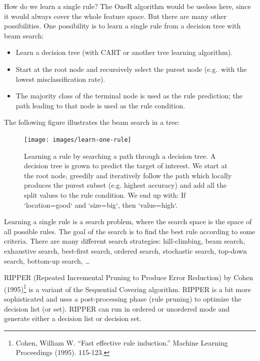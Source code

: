 \documentclass[
  12pt,
]{krantz}
\providecommand{\tightlist}{%
  \setlength{\itemsep}{0pt}\setlength{\parskip}{0pt}}
\begin{document}
How do we learn a single rule?
The OneR algorithm would be useless here, since it would always cover the whole feature space.
But there are many other possibilities.
One possibility is to learn a single rule from a decision tree with beam search:

\begin{itemize}
\tightlist
\item
  Learn a decision tree (with CART or another tree learning algorithm).
\item
  Start at the root node and recursively select the purest node (e.g.~with the lowest misclassification rate).
\item
  The majority class of the terminal node is used as the rule prediction;
  the path leading to that node is used as the rule condition.
\end{itemize}

The following figure illustrates the beam search in a tree:

\begin{figure}

{\centering \texttt{[image: images/learn-one-rule]} 

}

\caption{Learning a rule by searching a path through a decision tree. A decision tree is grown to predict the target of interest. We start at the root node, greedily and iteratively follow the path which locally produces the purest subset (e.g. highest accuracy) and add all the split values to the rule condition. We end up with: If `location=good` and `size=big`, then `value=high`.}\label{fig:learn-one-rule}
\end{figure}

Learning a single rule is a search problem, where the search space is the space of all possible rules.
The goal of the search is to find the best rule according to some criteria.
There are many different search strategies:
hill-climbing, beam search, exhaustive search, best-first search, ordered search, stochastic search, top-down search, bottom-up search, \ldots{}

RIPPER (Repeated Incremental Pruning to Produce Error Reduction) by Cohen (1995)\footnote{Cohen, William W. ``Fast effective rule induction.'' Machine Learning Proceedings (1995). 115-123.} is a variant of the Sequential Covering algorithm.
RIPPER is a bit more sophisticated and uses a post-processing phase (rule pruning) to optimize the decision list (or set).
RIPPER can run in ordered or unordered mode and generate either a decision list or decision set.
\end{document}
